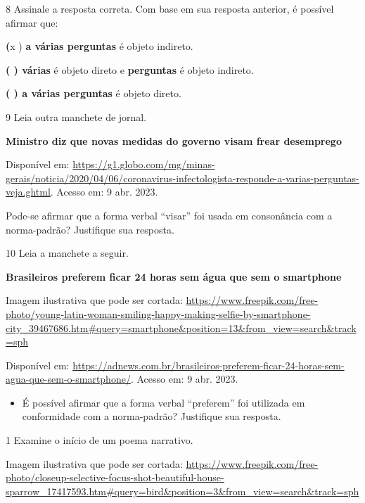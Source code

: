 \begin{itemize}
\begin{itemize}
{\begin{itemize}
\begin{itemize}
\num{8} Assinale a resposta correta. Com base em sua resposta anterior,
é possível afirmar que:

\textbf{(}x ) \textbf{a várias perguntas} é objeto indireto.

\textbf{( ) várias} é objeto direto e \textbf{perguntas} é objeto
indireto.

\textbf{( ) a várias perguntas} é objeto direto.

\num{9} Leia outra manchete de jornal.

\textbf{Ministro diz que novas medidas do governo visam frear
desemprego}

Disponível em:
\url{https://g1.globo.com/mg/minas-gerais/noticia/2020/04/06/coronavirus-infectologista-responde-a-varias-perguntas-veja.ghtml}.
Acesso em: 9 abr. 2023.

Pode-se afirmar que a forma verbal ``visar'' foi usada em consonância
com a norma-padrão? Justifique sua resposta. 

\num{10} Leia a manchete a seguir.

\textbf{Brasileiros preferem ficar 24 horas sem água que sem o
smartphone}

Imagem ilustrativa que pode ser cortada:
\url{https://www.freepik.com/free-photo/young-latin-woman-smiling-happy-making-selfie-by-smartphone-city_39467686.htm\#query=smartphone\&position=13\&from_view=search\&track=sph}

Disponível em:
\url{https://adnews.com.br/brasileiros-preferem-ficar-24-horas-sem-agua-que-sem-o-smartphone/}.
Acesso em: 9 abr. 2023.

\begin{itemize}
\tightlist
\item
  É possível afirmar que a forma verbal ``preferem'' foi utilizada em
  conformidade com a norma-padrão? Justifique sua resposta. 
\end{itemize}


\num{1} Examine o início de um poema narrativo.

Imagem ilustrativa que pode ser cortada:
\url{https://www.freepik.com/free-photo/closeup-selective-focus-shot-beautiful-house-sparrow_17417593.htm\#query=bird\&position=3\&from_view=search\&track=sph}


\end{itemize}
\end{itemize}}
\end{itemize}
\end{itemize}

